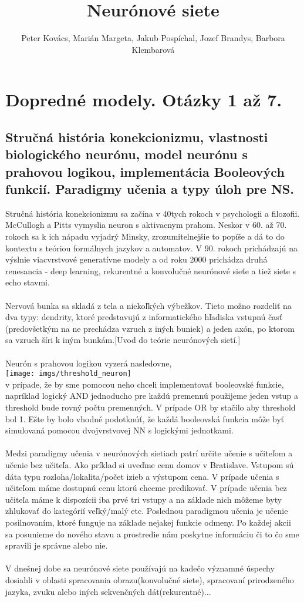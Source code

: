 \documentclass{article}
\title{ Neurónové siete}
\author{Peter Kovács, Marián Margeta, Jakub Pospíchal, Jozef Brandys, Barbora Klembarová}
\date{ }
\numberwithin{equation}{section} %
\begin{document}
\maketitle
\tableofcontents
\newpage
\section{Dopredné modely. Otázky 1 až 7. }
\subsection{Stručná história konekcionizmu, vlastnosti biologického neurónu, model neurónu s prahovou logikou,
implementácia Booleových funkcií. Paradigmy učenia a typy úloh pre NS.}
Stručná história konekcionizmu sa začína v 40tych rokoch v psychologii a filozofii. McCullogh a Pitts vymyslia neuron s aktivacnym prahom. Neskor v 60. až 70. rokoch sa k ich nápadu vyjadrý Minsky, zrozumitelnejšie to popíše a dá to do kontextu s teóriou formálnych jazykov a automatov. V 90. rokoch prichádzajú na výslnie viacvrstvové generatívne modely a od roku 2000 prichádza druhá renesancia - deep learning, rekurentné a konvolučné neurónové sieťe a tiež siete s echo stavmi.
\\\\
Nervová bunka sa skladá z tela a niekoľkých výbežkov. Tieto možno rozdeliť na dva typy: dendrity, ktoré predstavujú z informatického hľadiska vstupnú časť (predovšetkým na ne prechádza vzruch z iných buniek) a jeden axón, po ktorom sa vzruch šíri k iným bunkám.[Uvod do teórie neurónových sietí.]
\\\\
Neurón s prahovou logikou vyzerá nasledovne, \\
\texttt{[image: imgs/threshold\_neuron]}\\
v prípade, že by sme pomocou neho chceli implementovať booleovské funkcie, napríklad logický AND jednoducho pre každú premennú použijeme jeden vstup a threshold bude rovný počtu premenných. V prípade OR by stačilo aby threshold bol 1. Ešte by bolo vhodné podotknúť, že každá booleovská funkcia môže byť simulovaná pomocou dvojvrstvovej NN s logickými jednotkami.
\\\\
Medzi paradigmy učenia v neurónových sietiach patrí určite učenie s učiteľom a učenie bez učiteľa. Ako príklad si uveďme cenu domov v Bratislave. Vstupom sú dáta typu rozloha/lokalita/počet izieb a výstupom cena. V prípade učenia s učiteľom máme dostupnú cenu ktorú chceme predikovať. V prípade učenia bez učiteľa máme k dispozícii iba prvé tri vstupy a na základe nich môžeme byty zhlukovať do kategórií veľký/malý etc. Poslednou paradigmou učenia je učenie posilnovaním, ktoré funguje na základe nejakej funkcie odmeny. Po každej akcii sa posunieme do nového stavu a prostredie nám poskytne informáciu či to čo sme spravili je správne alebo nie.
\\\\
V dnešnej dobe sa neurónové siete používajú na kadečo významné úspechy dosiahli v oblasti spracovania obrazu(konvolučné siete), spracovaní prirodzeného jazyka, zvuku alebo iných sekvenčných dát(rekurentné)...
\end{document}
